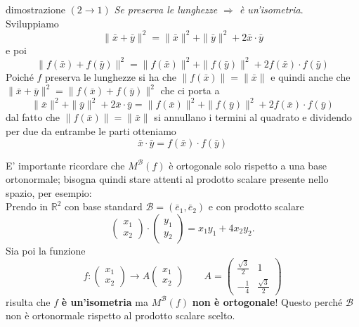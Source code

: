 \documentclass[x11names]{article}
\begin{document}
\begin{es}{dimostrazione $(2 \to 1)$}
	\textit{Se preserva le lunghezze $\Longrightarrow$ è un'isometria}.
	Sviluppiamo
	\[
	\| \bar{x} + \bar{y} \|^2 = \|\bar{x}\|^2 + \|\bar{y}\|^2 + 2\bar{x} \cdot \bar{y}
	\]
	e poi
	\[
	\| f(\bar{x}) + f(\bar{y}) \|^2 = \|f(\bar{x})\|^2 + \|f(\bar{y})\|^2 + 2f(\bar{x}) \cdot f(\bar{y})
	\]
	Poiché $f$ preserva le lunghezze si ha che $\| f(\bar{x}) \|  = \| \bar{x} \|$ e quindi anche che $\| \bar{x} + \bar{y} \|^2 = \| f(\bar{x}) + f(\bar{y}) \|^2$ che ci porta a
	\[
	\|\bar{x}\|^2 + \|\bar{y}\|^2 + 2\bar{x} \cdot \bar{y} = \|f(\bar{x})\|^2 + \|f(\bar{y})\|^2 + 2f(\bar{x}) \cdot f(\bar{y})
	\]
	dal fatto che $\| f(\bar{x}) \|  = \| \bar{x} \|$ si annullano i termini al quadrato e dividendo per due da entrambe le parti otteniamo
	\[
	\bar{x} \cdot \bar{y} = f(\bar{x}) \cdot f(\bar{y})
	\]
\end{es} 


\noindent
E' importante ricordare che $M^\mathcal{B}(f)$ è ortogonale solo rispetto a una base ortonormale; bisogna quindi stare attenti al prodotto scalare presente nello spazio, per esempio: \\

\noindent
Prendo in $\mathbb{R}^2$ con base standard $\mathcal{B} = (\bar{e}_{1},\bar{e}_{2})$ e con prodotto scalare
\[
\left(\begin{array}{c}
	x_{1} \\ x_{2}
\end{array}\right) \cdot \left(\begin{array}{c}
y_{1} \\ y_{2}
\end{array}\right) = x_{1}y_{1} + 4x_{2}y_{2}
.\]
Sia poi la funzione
\[
f:\left(\begin{array}{c}
	x_{1} \\ x_{2}
\end{array}\right) \to A\left(\begin{array}{c}
x_{1} \\ x_{2}
\end{array}\right) \qquad A = \left(\begin{array}{cc}
\frac{\sqrt{3}}{2} & 1 \\
-\frac{1}{4} & \frac{\sqrt{3}}{2}
\end{array}\right)
\]
risulta che $f$ \textbf{è un'isometria} ma $M^\mathcal{B}(f)$ \textbf{non è ortogonale}! Questo perché $\mathcal{B}$ non è ortonormale rispetto al prodotto scalare scelto.
\end{document}
